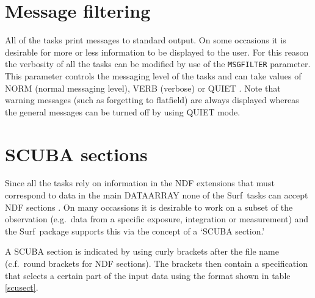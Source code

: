 \documentclass[twoside,11pt]{article}
\newcommand{\scusoft}          {{\sc Surf}}
\newcommand{\param}[1]{{\tt #1}}
\newcommand{\xlabel}[1]{}
\renewcommand{\_}{\texttt{\symbol{95}}}
\begin{document}
\section{Message filtering}

All of the tasks print messages to standard output. On some occasions it
is desirable for more or less information to be displayed to the user.
For this reason the verbosity of all the tasks can be modified by use of 
the \param{MSG\_FILTER} parameter. This parameter controls the messaging
level of the tasks and can take values of NORM (normal messaging level),
VERB (verbose) or QUIET \cite{mers}. Note that warning messages (such 
as forgetting to flatfield) are always displayed whereas the general messages
can be turned off by using QUIET mode.


\section{\xlabel{sections}SCUBA sections\label{sections}}

Since all the tasks rely on information in the NDF
extensions that must correspond to data in the main DATA\_ARRAY none of the
\scusoft\ tasks can accept NDF sections \cite{ndf}. On many occassions it
is desirable to work on a subset of the observation (e.g.\ data from a
specific exposure, integration or measurement) and the \scusoft\ package 
supports this via the concept of a `SCUBA section.'

A SCUBA section is indicated by using curly brackets after the file
name (c.f.\ round brackets for NDF sections). The brackets then contain
a specification that selects a certain part of the input data
using the format shown in table \ref{scusect}.
\end{document}
